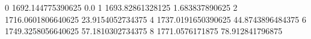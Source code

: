 0 1692.144775390625 0.0
1 1693.82861328125 1.683837890625
2 1716.0601806640625 23.9154052734375
4 1737.0191650390625 44.8743896484375
6 1749.3258056640625 57.1810302734375
8 1771.0576171875 78.912841796875

